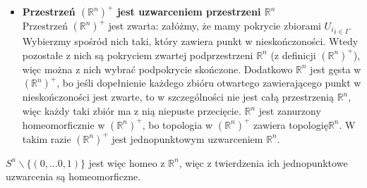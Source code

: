 \begin{itemize}
\item \textbf{Przestrzeń $(\mathbb{R}^n)^{+}$ jest uzwarceniem przestrzeni $\mathbb{R}^n$}\\
Przestrzeń $(\mathbb{R}^n)^{+}$ jest zwarta: załóżmy, że mamy pokrycie zbiorami ${U_i}_{i \in I}$. Wybierzmy spośród nich taki, który zawiera punkt w nieskończoności. Wtedy pozostałe z nich są pokryciem zwartej podprzestrzeni $\mathbb{R}^n$ (z definicji $(\mathbb{R}^n)^{+}$), więc można z nich wybrać podpokrycie skończone. 
Dodatkowo $\mathbb{R}^n$ jest gęsta w $(\mathbb{R}^n)^{+}$, bo jeśli dopełnienie każdego zbióru otwartego zawierającego punkt w nieskończoności jest zwarte, to w szczególności nie jest całą przestrzenią $\mathbb{R}^n$, więc każdy taki zbiór ma z nią niepuste przecięcie.
$\mathbb{R}^n$ jest zanurzony homeomorficznie w $(\mathbb{R}^n)^{+}$, bo topologia w $(\mathbb{R}^n)^{+}$ zawiera topologię$\mathbb{R}^n$.
W takim razie $(\mathbb{R}^n)^{+}$ jest jednopunktowym uzwarceniem $\mathbb{R}^n$.
\end{itemize}

$ S^n \backslash \{(0, ... 0, 1)\}$ jest więc homeo z $\mathbb{R}^n$, więc z twierdzenia ich jednopunktowe uzwarcenia są homeomorficzne.
